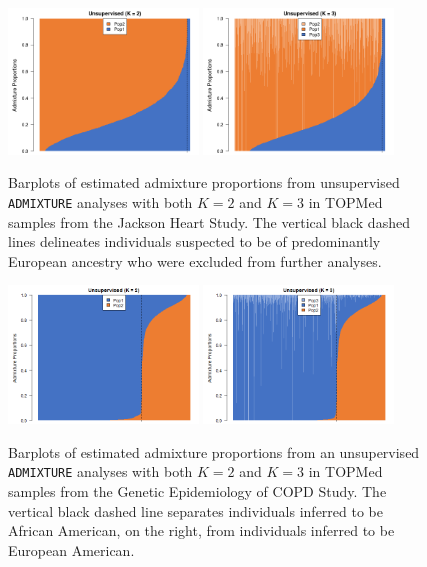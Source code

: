 \documentclass[12pt]{article}
\newcommand{\edit}[1]{{\color{red}{#1}}}
\begin{document}
\begin{figure}[h]
\center
\includegraphics[width=0.45\textwidth]{figs/JHS_barplot_unsupervised_K2}
\includegraphics[width=0.45\textwidth]{figs/JHS_barplot_unsupervised_K3}
\caption{Barplots of estimated admixture proportions from unsupervised \texttt{ADMIXTURE} analyses with both $K = 2$ and $K = 3$ in TOPMed samples from the Jackson Heart Study. The vertical black dashed lines delineates \edit{???} individuals suspected to be of predominantly European ancestry who were excluded from further analyses.}
\label{fig:JHSbarplots}
\end{figure}

\begin{figure}[h]
\center
\includegraphics[width=0.45\textwidth]{figs/COPD_barplot_unsupervised_K2}
\includegraphics[width=0.45\textwidth]{figs/COPD_barplot_unsupervised_K3}
\caption{Barplots of estimated admixture proportions from an unsupervised \texttt{ADMIXTURE} analyses with both $K = 2$ and $K = 3$ in TOPMed samples from the Genetic Epidemiology of COPD Study. The vertical black dashed line separates \edit{???} individuals inferred to be African American, on the right, from \edit{???} individuals inferred to be European American.}
\label{fig:COPDbarplots}
\end{figure}
\end{document}
